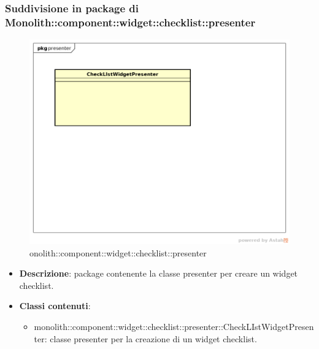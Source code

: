 \subsubsection{Suddivisione in package  di Monolith::component::widget::checklist::presenter}
\label{monolith::component::widget::checklist::presenter}
\begin{figure}[H]
	\centering
	\includegraphics[scale=0.5]{Sezioni/imgPackage/component_widget_checklist_presenter.png}
	\caption{onolith::component::widget::checklist::presenter}
\end{figure}
\begin{itemize}
	\item{\textbf{Descrizione}}: package contenente la classe presenter per creare un widget checklist.
	\item{\textbf{Classi contenuti}}:
	\begin{itemize}
	\item{monolith::component::widget::checklist::presenter::CheckLIstWidgetPresenter}: classe presenter per la creazione di un widget checklist.
	\end{itemize}
\end{itemize}



